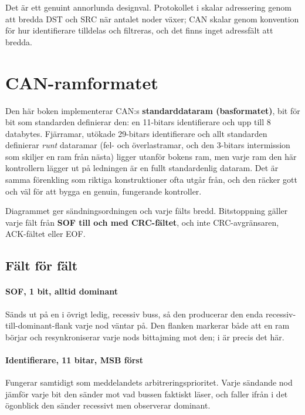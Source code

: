 Det är ett genuint annorlunda designval. Protokollet i  skalar adressering
genom att bredda DST och SRC när antalet noder växer; CAN skalar genom konvention för hur
identifierare tilldelas och filtreras, och det finns inget adressfält att bredda.

\section{CAN-ramformatet}
\label{c10:sec:frameformat}


Den här boken implementerar CAN:s \textbf{standarddataram (basformatet)}, bit för bit som standarden
definierar den: en 11-bitars identifierare och upp till 8 databytes. Fjärramar, utökade 29-bitars
identifierare och allt standarden definierar \emph{runt} dataramar (fel- och överlastramar, och den
3-bitars intermission som skiljer en ram från nästa) ligger utanför bokens ram, men varje ram den
här kontrollern lägger ut på ledningen är en fullt standardenlig dataram. Det är samma förenkling
som riktiga konstruktioner ofta utgår från, och den räcker gott och väl för att bygga en genuin,
fungerande kontroller.

Diagrammet ger sändningsordningen och varje fälts bredd. Bitstoppning gäller varje fält från
\textbf{SOF till och med CRC-fältet}, och inte CRC-avgränsaren, ACK-fältet eller EOF.

\subsection*{Fält för fält}
\paragraph{SOF, 1 bit, alltid dominant}
Sänds ut på en i övrigt ledig, recessiv buss, så den producerar den enda
recessiv-till-dominant-flank varje nod väntar på. Den flanken markerar både att en ram börjar och
resynkroniserar varje nods bittajming mot den;  i  är precis
det här.

\paragraph{Identifierare, 11 bitar, MSB först}
Fungerar samtidigt som meddelandets arbitreringsprioritet. Varje sändande nod jämför varje bit den
sänder mot vad bussen faktiskt läser, och faller ifrån i det ögonblick den sänder recessivt men
observerar dominant.

